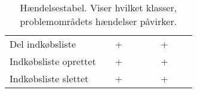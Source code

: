 \begin{table}[H]
\begin{tabular}{l|lccccccc}
      Del indkøbsliste              &                                                  & +                           &                           &                               &                           & +                     \\ 
      Indkøbsliste oprettet         &                                                 & +                           &                           &                               &                           & +                     \\ 
      Indkøbsliste slettet         &                                                & +                           &                           &                               &                           & +                     \\ 
    \end{tabular}
  \caption{Hændelsestabel. Viser hvilket klasser, problemområdets hændelser påvirker.}\label{tabel:haendelsestabel}
\end{table}
